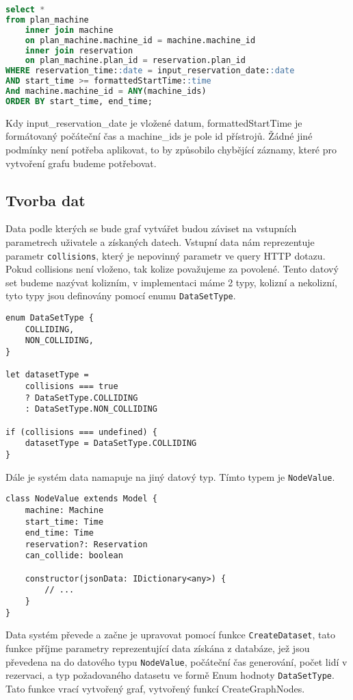 \begin{lstlisting}[language=SQL]
select * 
from plan_machine 
    inner join machine 
	on plan_machine.machine_id = machine.machine_id
    inner join reservation
	on plan_machine.plan_id = reservation.plan_id
WHERE reservation_time::date = input_reservation_date::date
AND start_time >= formattedStartTime::time
And machine.machine_id = ANY(machine_ids)
ORDER BY start_time, end_time;
\end{lstlisting}
Kdy input\_reservation\_date je vložené datum, formattedStartTime je formátovaný počáteční čas a machine\_ids je pole id přístrojů.
Žádné jiné podmínky není potřeba aplikovat, to by způsobilo chybějící záznamy, které pro vytvoření grafu budeme potřebovat.

\subsection{Tvorba dat}
Data podle kterých se bude graf vytvářet budou záviset na vstupních parametrech uživatele a získaných datech. Vstupní data nám reprezentuje parametr \texttt{collisions}, který je nepovinný parametr ve query HTTP dotazu. Pokud collisions není vloženo, tak kolize považujeme za povolené. Tento datový set budeme nazývat kolizním, v implementaci máme 2 typy, kolizní a nekolizní, tyto typy jsou definovány pomocí enumu \texttt{DataSetType}.

\begin{lstlisting}
enum DataSetType {
    COLLIDING,
    NON_COLLIDING,
}

let datasetType =
    collisions === true
	? DataSetType.COLLIDING
	: DataSetType.NON_COLLIDING

if (collisions === undefined) {
    datasetType = DataSetType.COLLIDING
}
\end{lstlisting}

Dále je systém data namapuje na jiný datový typ. Tímto typem je \texttt{NodeValue}.

\begin{lstlisting}
class NodeValue extends Model {
    machine: Machine
    start_time: Time
    end_time: Time
    reservation?: Reservation
    can_collide: boolean

    constructor(jsonData: IDictionary<any>) {
	    // ...
    }
}
\end{lstlisting}
Data systém převede a začne je upravovat pomocí funkce \texttt{CreateDataset}, tato funkce příjme parametry reprezentující data získána z databáze, jež jsou převedena na do datového typu \texttt{NodeValue}, počáteční čas generování, počet lidí v rezervaci, a typ požadovaného datasetu ve formě Enum hodnoty \texttt{DataSetType}. Tato funkce vrací vytvořený graf, vytvořený funkcí CreateGraphNodes. 

